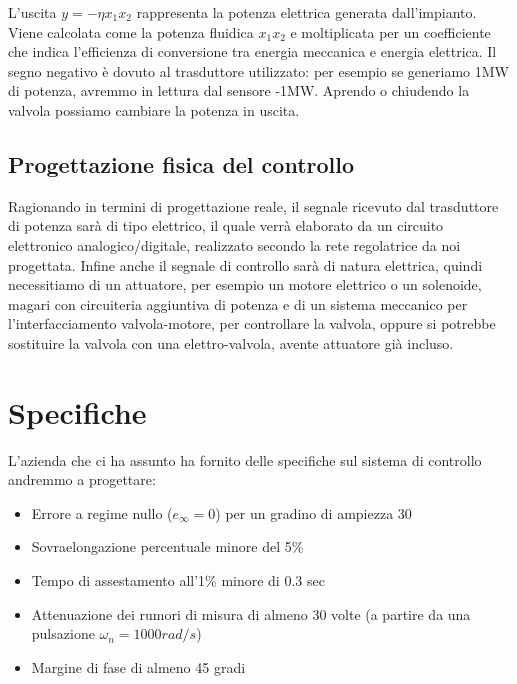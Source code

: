 \documentclass{article}
\begin{document}
L'uscita $y=-\eta x_1 x_2$ rappresenta la potenza elettrica generata dall'impianto. Viene calcolata come la potenza fluidica $x_1 x_2$ e moltiplicata per un coefficiente che indica l'efficienza di conversione tra energia meccanica e energia elettrica. Il segno negativo è dovuto al trasduttore utilizzato: per esempio se generiamo 1MW di potenza, avremmo in lettura dal sensore -1MW. Aprendo o chiudendo la valvola possiamo cambiare la potenza in uscita.


\subsection{Progettazione fisica del controllo}

Ragionando in termini di progettazione reale, il segnale ricevuto dal trasduttore di potenza sarà di tipo elettrico, il quale verrà elaborato da un circuito elettronico analogico/digitale, realizzato secondo la rete regolatrice da noi progettata. 
Infine anche il segnale di controllo sarà di natura elettrica, quindi necessitiamo di un attuatore, per esempio un motore elettrico o un solenoide, magari con circuiteria aggiuntiva di potenza e di un sistema meccanico per l'interfacciamento valvola-motore, per controllare la valvola, oppure si potrebbe sostituire la valvola con una elettro-valvola, avente attuatore già incluso.

\section{Specifiche}

L'azienda che ci ha assunto ha fornito delle specifiche sul sistema di controllo andremmo a progettare:

\begin{itemize}
    \item Errore a regime nullo ($e_{\infty}=0$) per un gradino di ampiezza 30
    \item Sovraelongazione percentuale minore del 5\%
    \item Tempo di assestamento all'1\% minore di 0.3 sec
    \item Attenuazione dei rumori di misura di almeno 30 volte (a partire da una pulsazione $\omega_n=1000 rad/s$)
    \item Margine di fase di almeno 45 gradi
\end{itemize}
\end{document}
